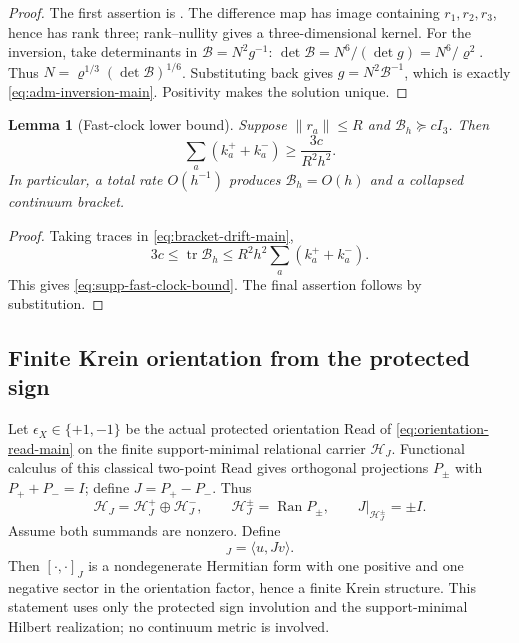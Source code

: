 \documentclass[11pt]{article}
\numberwithin{equation}{section}
\newtheorem{lemma}[lemma]{Lemma}
\theoremstyle{definition}
\theoremstyle{remark}
\newcommand{\tr}{\operatorname{tr}}
\newcommand{\Ran}{\operatorname{Ran}}
\newcommand{\norm}[1]{\lVert#1\rVert}
\begin{document}
\begin{proof}
The first assertion is .  The difference map has
image containing $r_1,r_2,r_3$, hence has rank three; rank--nullity gives a
three-dimensional kernel.  For the inversion, take determinants in
$\mathcal B=N^2g^{-1}$:
$\det\mathcal B=N^6/(\det g)=N^6/\varrho^2$.  Thus
$N=\varrho^{1/3}(\det\mathcal B)^{1/6}$.  Substituting back gives
$g=N^2\mathcal B^{-1}$, which is exactly
\eqref{eq:adm-inversion-main}.  Positivity makes the solution unique.
\end{proof}

\begin{lemma}[Fast-clock lower bound]
\label{lem:supp-fast-clock}
Suppose $\norm{r_a}\le R$ and $\mathcal B_h\succeq cI_3$.  Then
\begin{equation}
 \sum_a(k_a^++k_a^-)\ge\frac{3c}{R^2h^2}.
 \label{eq:supp-fast-clock-bound}
\end{equation}
In particular, a total rate $O(h^{-1})$ produces $\mathcal B_h=O(h)$ and a
collapsed continuum bracket.
\end{lemma}

\begin{proof}
Taking traces in \eqref{eq:bracket-drift-main},
\[
 3c\le\tr\mathcal B_h
 \le R^2h^2\sum_a(k_a^++k_a^-).
\]
This gives \eqref{eq:supp-fast-clock-bound}.  The final assertion follows by
substitution.
\end{proof}

\subsection{Finite Krein orientation from the protected sign}

Let $\epsilon_X\in\{+1,-1\}$ be the actual protected orientation Read of
\eqref{eq:orientation-read-main} on the finite support-minimal relational
carrier $\mathcal H_J$.  Functional calculus of this classical two-point Read
gives orthogonal projections $P_\pm$ with $P_++P_-=I$; define
$J=P_+-P_-$.  Thus
\begin{equation}
 \mathcal H_J=\mathcal H_J^+\oplus\mathcal H_J^-,
 \qquad
 \mathcal H_J^\pm=\Ran P_\pm,
 \qquad
 J|_{\mathcal H_J^\pm}=\pm I.
 \label{eq:supp-krein-splitting}
\end{equation}
Assume both summands are nonzero.  Define
\begin{equation}
 [u,v]_J=\langle u,Jv\rangle.
 \label{eq:supp-krein-form}
\end{equation}
Then $[\cdot,\cdot]_J$ is a nondegenerate Hermitian form with one positive and one negative sector in the orientation factor, hence a finite Krein structure.  This statement uses only the protected sign involution and the support-minimal Hilbert realization; no continuum metric is involved.
\end{document}
